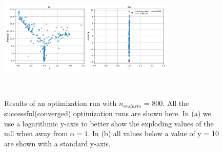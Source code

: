 \documentclass{article}
\begin{document}
\begin{figure}
    \centering
    \includegraphics[width=0.75\textwidth]{../final_examples/heat_equation/heat_equation_optim_distribution.png}
    \caption{Results of an optimization run with $n_{restarts}$ = 800. All the successful(converged) optimization runs are shown here. In (a) we use a logarithmic y-axis to better show the exploding values of the mll when away from $\alpha = 1$. In (b) all values below a value of y = 10 are shown with a standard y-axis.}
    ~\label{fig:results_optrun}
\end{figure}
\newpage 
\end{document}
